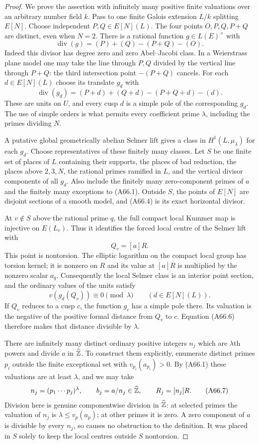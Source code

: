 \begin{proof}
We prove the assertion with infinitely many
positive finite valuations over an arbitrary
number field $k$. Pass to one finite Galois
extension $L/k$ splitting $E[N]$. Choose
independent $P,Q\in E[N](L)$. The four points
$O,P,Q,P+Q$ are distinct, even when $N=2$.
There is a rational function $g\in L(E)^\times$
with
\[
 \operatorname{div}(g)=(P)+(Q)-(P+Q)-(O).
 \tag{A66.3}
\]
Indeed this divisor has degree zero and zero
Abel--Jacobi class. In a Weierstrass plane model
one may take the line through $P,Q$ divided by
the vertical line through $P+Q$: the third
intersection point $-(P+Q)$ cancels.
For each $d\in E[N](L)$ choose its translate
$g_d$ with
\[
 \operatorname{div}(g_d)
   =(P+d)+(Q+d)-(P+Q+d)-(d).
 \tag{A66.4}
\]
These are units on $U$, and every cusp $d$
is a simple pole of the corresponding $g_d$.
The use of simple orders is what permits
every coefficient prime $\lambda$, including
the primes dividing $N$.

A putative global geometrically abelian
Selmer lift gives a class in
$H^1(L,\mu_\lambda)$ for each $g_d$.
Choose representatives of these finitely many
classes. Let $S$ be one finite set of places
of $L$ containing their supports, the places
of bad reduction, the places above $2,3,N$,
the rational primes ramified in $L$, and the
vertical divisor components of all $g_d$.
Also include the finitely many zero-component
primes of $a$ and the finitely many exceptions
to (A66.1). Outside $S$, the points of $E[N]$
are disjoint sections of a smooth model,
and (A66.4) is its exact horizontal divisor.

At $v\notin S$ above the rational prime $q$,
the full compact local Kummer map is injective
on $E(L_v)$. Thus it identifies the forced
local centre of the Selmer lift with
\[
 Q_v=[a]R.
 \tag{A66.5}
\]
This point is nontorsion. The elliptic
logarithm on the compact local group has
torsion kernel; it is nonzero on $R$ and
its value at $[a]R$ is multiplied by the
nonzero scalar $a_q$. Consequently the
local Selmer class is an interior point
section, and the ordinary values of the
units satisfy
\[
 v(g_d(Q_v))\equiv0\pmod\lambda
                   \qquad(d\in E[N](L)).
 \tag{A66.6}
\]
If $Q_v$ reduces to a cusp $c$, the function
$g_c$ has a simple pole there. Its valuation
is the negative of the positive formal
distance from $Q_v$ to $c$. Equation
(A66.6) therefore makes that distance
divisible by $\lambda$.

There are infinitely many distinct ordinary
positive integers $n_j$ which are
$\lambda$th powers and divide $a$ in
$\widehat{\mathbb Z}$. To construct them explicitly,
enumerate distinct primes $p_i$ outside
the finite exceptional set with
$v_{p_i}(a_{p_i})>0$. By (A66.1) these
valuations are at least $\lambda$, and
we may take
\[
 n_j=(p_1\cdots p_j)^\lambda,\qquad
 b_j=a/n_j\in\widehat{\mathbb Z},\qquad R_j=[n_j]R.
 \tag{A66.7}
\]
Division here is genuine componentwise
division in $\widehat{\mathbb Z}$: at selected
primes the valuation of $n_j$ is
$\lambda\le v_p(a_p)$; at other primes
it is zero. A zero component of $a$
is divisible by every $n_j$, so causes
no obstruction to the definition.
It was placed in $S$ solely to keep the
local centres outside $S$ nontorsion.


\end{proof}
